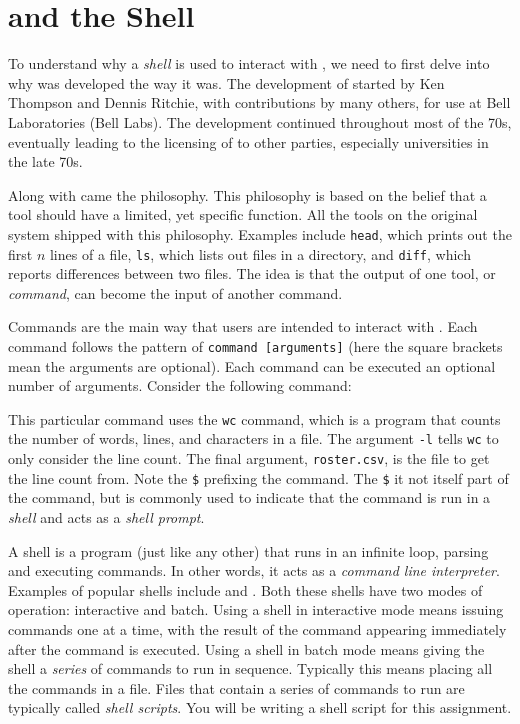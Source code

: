 \section{\Unix{} and the Shell}\label{section:unix}

\noindent To understand why a \emph{shell} is used to interact with
\Unix{}, we need to first delve into why \Unix{} was developed the
way it was. The development of \Unix{} started by
Ken Thompson and Dennis Ritchie, with contributions by many others, for use at Bell
Laboratories (Bell Labs). The development continued throughout most of the 70s, eventually leading
to the licensing of \Unix{} to other parties, especially universities in the late 70s.

Along with \Unix{} came the \Unix{} philosophy. This philosophy is
based on the belief that a tool should have a limited, yet specific
function. All the tools on the original \Unix{} system shipped with this
philosophy. Examples include \texttt{head}, which prints out the first $n$ lines
of a file, \texttt{ls}, which lists out files in a directory, and \texttt{diff},
which reports differences between two files. The idea is that the output of one
tool, or \emph{command}, can become the input of another command.

Commands are the main way that users are intended to interact with
\Unix{}. Each command follows the pattern of \texttt{command
[arguments]} (here the square brackets mean the arguments are
optional). Each command can be executed an optional number of
arguments. Consider the following command:


This particular command uses the \texttt{wc} command, which is a program that
counts the number of words, lines, and characters in a file. The argument
\texttt{-l} tells \texttt{wc} to only consider the line count. The final
argument, \texttt{roster.csv}, is the file to get the line count from. Note the
\texttt{\$} prefixing the command. The \texttt{\$} it not itself part of the
command, but is commonly used to indicate that the command is run in a
\emph{shell} and acts as a \emph{shell prompt}.

A shell is a program (just like any other) that runs in an infinite loop, parsing and executing
commands. In other words, it acts as a \emph{command line interpreter}. Examples
of popular shells include \Bash{} and \Zsh{}. Both these shells have two modes of
operation: interactive and batch. Using a shell in interactive mode means
issuing commands one at a time, with the result of the command appearing
immediately after the command is executed. Using a shell in batch mode means
giving the shell a \emph{series} of commands to run in sequence. Typically this
means placing all the commands in a file. Files that contain a series of
commands to run are typically called \emph{shell scripts}. You will be writing a
shell script for this assignment.

